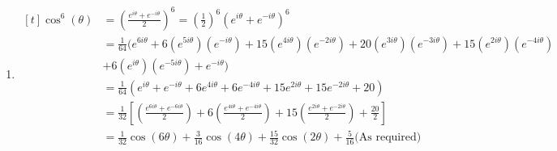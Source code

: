 \documentclass[../main.tex]{subfiles}
\begin{document}
\begin{enumerate}
    \item
    $
    \!
    \begin{aligned}[t]
     \cos^6(\theta)
        &=(\frac{e^{i\theta}+e^{-i\theta}}{2})^6= (\frac{1}{2})^6(e^{i\theta}+e^{-i\theta})^6 \\
        &= \frac{1}{64}(e^{6i\theta}+6(e^{5i\theta})(e^{-i\theta})+15(e^{4i\theta})(e^{-2i\theta})+20(e^{3i\theta})(e^{-3i\theta})+15(e^{2i\theta})(e^{-4i\theta})\\
        &+6(e^{i\theta})(e^{-5i\theta})+e^{-i\theta})\\
        &=\frac{1}{64}(e^{i\theta}+e^{-i\theta}+6e^{4i\theta}+6e^{-4i\theta}+15e^{2i\theta}+15e^{-2i\theta}+20)\\
        &=\frac{1}{32}[(\frac{e^{6i\theta}+e^{-6i\theta}}{2})+6(\frac{e^{4i\theta}+e^{-4i\theta}}{2})+15(\frac{e^{2i\theta}+e^{-2i\theta}}{2})+\frac{20}{2}]\\
        &=\frac{1}{32}\cos(6\theta)+\frac{3}{16}\cos(4\theta)+\frac{15}{32}\cos(2\theta)+\frac{5}{16} \text{(As required)}
    \end{aligned}
    $
    
\end{enumerate}
\end{document}
